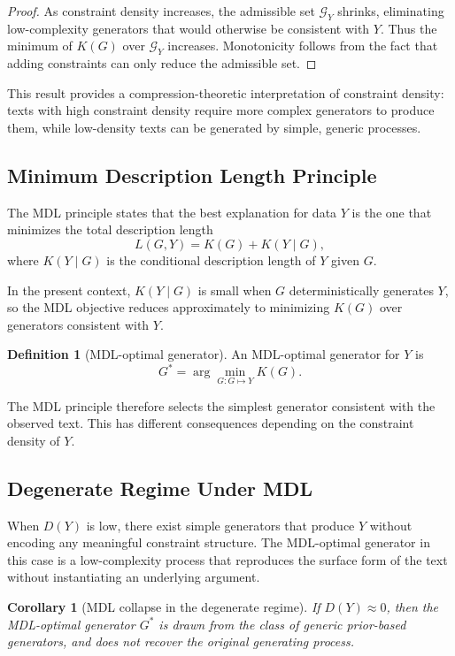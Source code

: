 \documentclass[12pt, oneside]{article}
\theoremstyle{plain}
\newtheorem{corollary}[theorem]{Corollary}
\theoremstyle{definition}
\newtheorem{definition}[theorem]{Definition}
\theoremstyle{remark}
\begin{document}
\begin{proof}
As constraint density increases, the admissible set $\mathcal{G}_Y$ shrinks,
eliminating low-complexity generators that would otherwise be consistent with $Y$.
Thus the minimum of $K(G)$ over $\mathcal{G}_Y$ increases. Monotonicity follows
from the fact that adding constraints can only reduce the admissible set.
\end{proof}

This result provides a compression-theoretic interpretation of constraint density:
texts with high constraint density require more complex generators to produce them,
while low-density texts can be generated by simple, generic processes.

\subsection{Minimum Description Length Principle}

The MDL principle states that the best explanation for data $Y$ is the one that
minimizes the total description length
\[
  L(G, Y) = K(G) + K(Y \mid G),
\]
where $K(Y \mid G)$ is the conditional description length of $Y$ given $G$.

In the present context, $K(Y \mid G)$ is small when $G$ deterministically generates $Y$,
so the MDL objective reduces approximately to minimizing $K(G)$ over generators
consistent with $Y$.

\begin{definition}[MDL-optimal generator]
An MDL-optimal generator for $Y$ is
\[
  G^* = \arg\min_{G : G \mapsto Y} K(G).
\]
\end{definition}

The MDL principle therefore selects the simplest generator consistent with the
observed text. This has different consequences depending on the constraint density
of $Y$.

\subsection{Degenerate Regime Under MDL}

When $D(Y)$ is low, there exist simple generators that produce $Y$ without encoding
any meaningful constraint structure. The MDL-optimal generator in this case is a
low-complexity process that reproduces the surface form of the text without
instantiating an underlying argument.

\begin{corollary}[MDL collapse in the degenerate regime]
If $D(Y) \approx 0$, then the MDL-optimal generator $G^*$ is drawn from the class
of generic prior-based generators, and does not recover the original generating
process.
\end{corollary}
\end{document}
